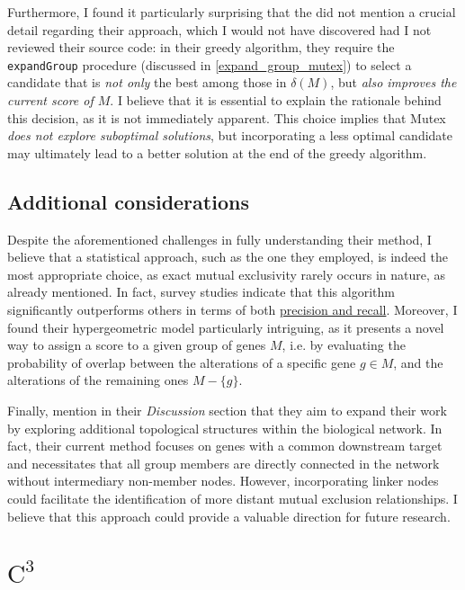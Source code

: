 Furthermore, I found it particularly surprising that the \textcite{mutex} did not mention a crucial detail regarding their approach, which I would not have discovered had I not reviewed their source code: in their greedy algorithm, they require the \texttt{expandGroup} procedure (discussed in \cref{expand_group_mutex}) to select a candidate that is \textit{not only} the best among those in $\delta(M)$, but \textit{also improves the current score of $M$}. I believe that it is essential to explain the rationale behind this decision, as it is not immediately apparent. This choice implies that Mutex \textit{does not explore suboptimal solutions}, but incorporating a less optimal candidate may ultimately lead to a better solution at the end of the greedy algorithm.

\subsection{Additional considerations}

Despite the aforementioned challenges in fully understanding their method, I believe that a statistical approach, such as the one they employed, is indeed the most appropriate choice, as exact mutual exclusivity rarely occurs in nature, as already mentioned. In fact, survey studies \cite{survey} indicate that this algorithm significantly outperforms others in terms of both \href{https://en.wikipedia.org/wiki/Precision_and_recall}{precision and recall}. Moreover, I found their hypergeometric model particularly intriguing, as it presents a novel way to assign a score to a given group of genes $M$, i.e. by evaluating the probability of overlap between the alterations of a specific gene $g \in M$, and the alterations of the remaining ones $M-\{g\}$.

Finally, \textcite{mutex} mention in their \textit{Discussion} section that they aim to expand their work by exploring additional topological structures within the biological network. In fact, their current method focuses on genes with a common downstream target and necessitates that all group members are directly connected in the network without intermediary non-member nodes. However, incorporating linker nodes could facilitate the identification of more distant mutual exclusion relationships. I believe that this approach could provide a valuable direction for future research.

\section{$\mathrm{C}^3$}

